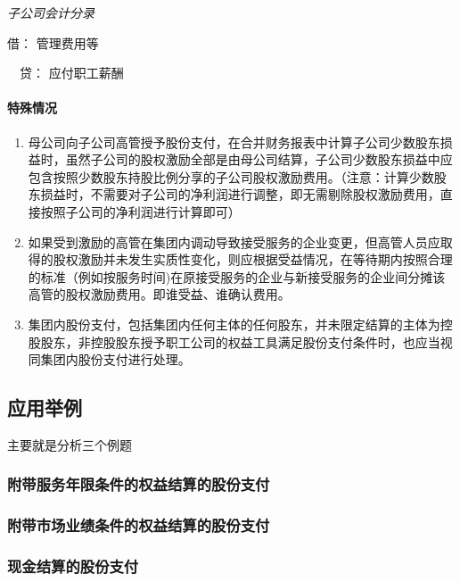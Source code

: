 \documentclass[UTF8,12pt]{ctexart}
\newenvironment{Dr}{\noindent 借：}{\par}
\newenvironment{Cr}{\noindent \ \ 贷：}{\par}
\numberwithin{equation}{section} %
\numberwithin{figure}{section}
\numberwithin{table}{section}
\begin{document}
	\textit{子公司会计分录}
	
	\begin{Dr}
		管理费用等
	\end{Dr}
	\begin{Cr}
		应付职工薪酬
	\end{Cr}
	
	\paragraph{特殊情况}
	\begin{enumerate}
		\item 母公司向子公司高管授予股份支付，在合并财务报表中计算子公司少数股东损益时，虽然子公司的股权激励全部是由母公司结算，子公司少数股东损益中应包含按照少数股东持股比例分享的子公司股权激励费用。（注意：计算少数股东损益时，不需要对子公司的净利润进行调整，即无需剔除股权激励费用，直接按照子公司的净利润进行计算即可）
		
		\item 如果受到激励的高管在集团内调动导致接受服务的企业变更，但高管人员应取得的股权激励并未发生实质性变化，则应根据受益情况，在等待期内按照合理的标准（例如按服务时间)在原接受服务的企业与新接受服务的企业间分摊该高管的股权激励费用。即谁受益、谁确认费用。
		
		\item 集团内股份支付，包括集团内任何主体的任何股东，并未限定结算的主体为控股股东，非控股股东授予职工公司的权益工具满足股份支付条件时，也应当视同集团内股份支付进行处理。
	\end{enumerate}

	
	\subsection{应用举例}
	主要就是分析三个例题
	
	\subsubsection{附带服务年限条件的权益结算的股份支付}
	
	\subsubsection{附带市场业绩条件的权益结算的股份支付}
	
	\subsubsection{现金结算的股份支付}
	
\end{document}
